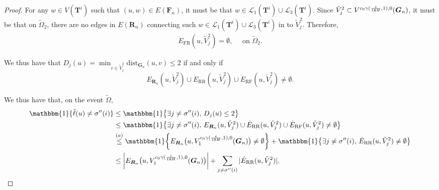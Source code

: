 \documentclass[twoside,11pt]{article}
\theoremstyle{remark}
\begin{document}
\begin{proof}
For any $w \in V(\bm{T}^i)$ such that $(u, w) \in E(\bm{F}_n)$, it must be that $w \in \mathcal{L}_1(\bm{T}^i) \cup \mathcal{L}_3(\bm{T}^i)$. Since $\tilde{V}^2_j \subset V^{c_0 \gamma(\frac{\varepsilon}{18H}, 1){\color{blue},}0}(\bm{G}_n)$, it must be that on $\tilde{\Omega}_2$, there are no edges in $E(\bm{R}_n)$ connecting such $w \in \mathcal{L}_1(\bm{T}^i) \cup \mathcal{L}_3(\bm{T}^i)$ in  to $\tilde{V}_j^2$. Therefore,
\begin{align}
\dot{E}_{\text{FR}}(u, \tilde{V}_j^2) = \emptyset, \quad \text{ on } \tilde{\Omega}_2.
\end{align}



We thus have that $D_j(u) = \min_{v \in \tilde{V}_j^2} \text{dist}_{\bm{G}_n}(u, v) \leq 2$ if and only if 
\[
E_{\bm{R}_n}(u, \tilde{V}_j^2)\cup \dot{E}_{\text{RR}}(u, \tilde{V}_j^2) \cup \dot{E}_{\text{RF}}(u, \tilde{V}_j^2) \neq \emptyset.
\]



We thus have that, on the event $\tilde{\Omega}$, 
\begin{align*}
\mathbbm{1}\{ \hat{\ell}(u) \neq \sigma''(i)\} 
&\leq 
\mathbbm{1}\bigl\{ \exists j \neq \sigma''(i), \, D_j(u) \leq 2 \bigr\} \\
%
&\leq
\mathbbm{1}\bigl\{ \exists j \neq \sigma''(i), \, E_{\bm{R}_n}(u, \tilde{V}_j^2) \cup \dot{E}_{\text{RR}}(u, \tilde{V}_j^2) \cup \dot{E}_{\text{RF}}(u, \tilde{V}_j^2) \neq \emptyset \bigr\} \\
%
&\stackrel{(a)}{\leq} \mathbbm{1}\biggl\{ E_{\bm{R}_n}\bigl(u, V_1^{c_0 \gamma(\frac{\varepsilon}{18H}, 1), 0}(\bm{G}_n) \bigr) \neq \emptyset \biggr\} + \mathbbm{1}\bigl\{ \exists j \neq \sigma''(i), \, \dot{E}_{\text{RR}}(u, \tilde{V}_j^2) \neq \emptyset \bigr\}\\
%
&\leq \biggl| E_{\bm{R}_n}\bigl(u, V_1^{c_0 \gamma(\frac{\varepsilon}{18H}, 1), 0}(\bm{G}_n) \bigr) \biggr| + \sum_{j \neq \sigma''(i)} | \dot{E}_{\text{RR}}(u, \tilde{V}_j^2) |.
\end{align*}


\end{proof}
\end{document}

